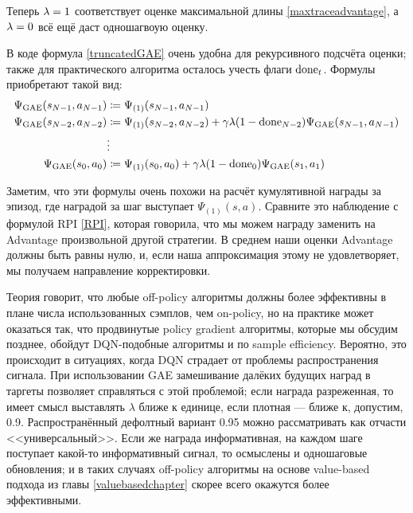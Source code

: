 Теперь $\lambda \HM= 1$ соответствует оценке максимальной длины \eqref{maxtraceadvantage}, а $\lambda \HM= 0$ всё ещё даст одношагвоую оценку.

В коде формула \eqref{truncatedGAE} очень удобна для рекурсивного подсчёта оценки; также для практического алгоритма осталось учесть флаги $\mathrm{done}_t$. Формулы приобретают такой вид:
\begin{equation*}
\begin{split}
\Psi_{\mathrm{GAE}}(s_{N-1}, a_{N-1}) &\coloneqq \Psi_{(1)}(s_{N-1}, a_{N-1}) \\
\Psi_{\mathrm{GAE}}(s_{N-2}, a_{N-2}) &\coloneqq \Psi_{(1)}(s_{N-2}, a_{N-2}) + \gamma \lambda (1 - \mathrm{done}_{N-2}) \Psi_{\mathrm{GAE}}(s_{N-1}, a_{N-1}) \\
&\vdots \\
\Psi_{\mathrm{GAE}}(s_0, a_0) &\coloneqq \Psi_{(1)}(s_0, a_0) + \gamma \lambda (1 - \mathrm{done}_0) \Psi_{\mathrm{GAE}}(s_1, a_1)
\end{split}
\end{equation*}

Заметим, что эти формулы очень похожи на расчёт кумулятивной награды за эпизод, где наградой за шаг выступает $\Psi_{(1)}(s, a)$. Сравните это наблюдение с формулой RPI \eqref{RPI}, которая говорила, что мы можем награду заменить на Advantage произвольной другой стратегии. В среднем наши оценки Advantage должны быть равны нулю, и, если наша аппроксимация этому не удовлетворяет, мы получаем направление корректировки.

\begin{remark}
Теория говорит, что любые off-policy алгоритмы должны более эффективны в плане числа использованных сэмплов, чем on-policy, но на практике может оказаться так, что продвинутые policy gradient алгоритмы, которые мы обсудим позднее, обойдут DQN-подобные алгоритмы и по sample efficiency. Вероятно, это происходит в ситуациях, когда DQN страдает от проблемы распространения сигнала. При использовании GAE замешивание далёких будущих наград в таргеты позволяет справляться с этой проблемой; если награда разреженная, то имеет смысл выставлять $\lambda$ ближе к единице, если плотная --- ближе к, допустим, 0.9. Распространённый дефолтный вариант 0.95 можно рассматривать как отчасти <<универсальный>>. Если же награда информативная, на каждом шаге поступает какой-то информативный сигнал, то осмыслены и одношаговые обновления; и в таких случаях off-policy алгоритмы на основе value-based подхода из главы \ref{valuebasedchapter} скорее всего окажутся более эффективными.
\end{remark}

